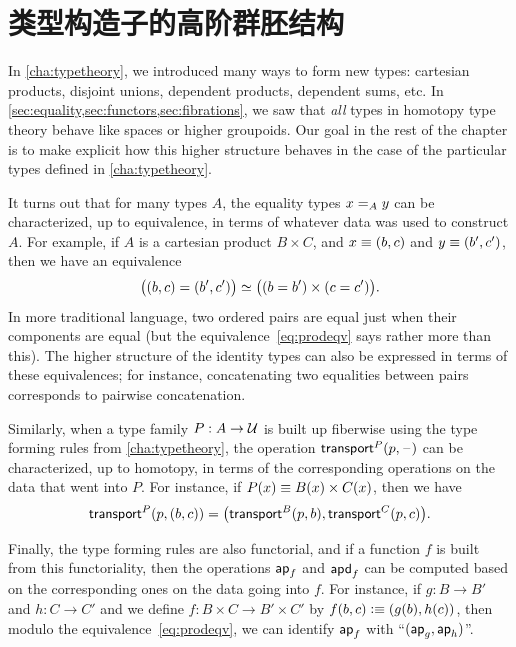 %


\section{类型构造子的高阶群胚结构}
\label{sec:computational}

In \cref{cha:typetheory}, we introduced many ways to form new types: cartesian products, disjoint unions, dependent products, dependent sums, etc.
In \cref{sec:equality,sec:functors,sec:fibrations}, we saw that \emph{all} types in homotopy type theory behave like spaces or higher groupoids.
Our goal in the rest of the chapter is to make explicit how this higher structure behaves in the case of the particular types defined in \cref{cha:typetheory}.

It turns out that for many types $A$, the equality types $\id[A]xy$ can be characterized, up to equivalence, in terms of whatever data was used to construct $A$.
For example, if $A$ is a cartesian product $B\times C$, and $x\jdeq (b,c)$ and $y\jdeq(b',c')$, then we have an equivalence
\begin{equation}\label{eq:prodeqv}
  \eqv{\big((b,c)=(b',c')\big)}{\big((b=b')\times (c=c')\big)}.
\end{equation}
In more traditional language, two ordered pairs are equal just when their components are equal (but the equivalence~\eqref{eq:prodeqv} says rather more than this).
The higher structure of the identity types can also be expressed in terms of these equivalences; for instance, concatenating two equalities between pairs corresponds to pairwise concatenation.

Similarly, when a type family $P:A\to\type$ is built up fiberwise using the type forming rules from \cref{cha:typetheory}, the operation $\transfib{P}{p}{\blank}$ can be characterized, up to homotopy, in terms of the corresponding operations on the data that went into $P$.
For instance, if $P(x) \jdeq B(x)\times C(x)$, then we have
\[\transfib{P}{p}{(b,c)} = \big(\transfib{B}{p}{b},\transfib{C}{p}{c}\big).\]

Finally, the type forming rules are also functorial, and if a function $f$ is built from this functoriality, then the operations $\apfunc f$ and $\apdfunc f$ can be computed based on the corresponding ones on the data going into $f$.
For instance, if $g:B\to B'$ and $h:C\to C'$ and we define $f:B\times C \to B'\times C'$ by $f(b,c)\defeq (g(b),h(c))$, then modulo the equivalence~\eqref{eq:prodeqv}, we can identify $\apfunc f$ with ``$(\apfunc g,\apfunc h)$''.

